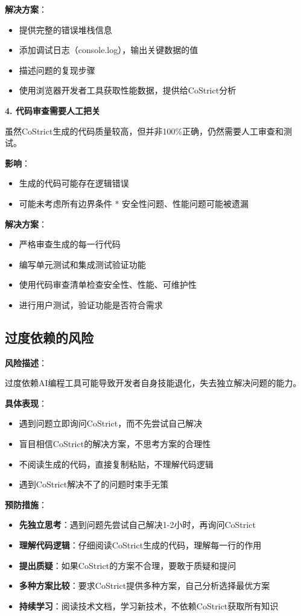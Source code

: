﻿\documentclass[12pt,a4paper]{article}
\begin{document}
\textbf{解决方案}：
\begin{itemize}
    \item 提供完整的错误堆栈信息
    \item 添加调试日志（console.log），输出关键数据的值
    \item 描述问题的复现步骤
    \item 使用浏览器开发者工具获取性能数据，提供给CoStrict分析
\end{itemize}

\textbf{4. 代码审查需要人工把关}

虽然CoStrict生成的代码质量较高，但并非100\%正确，仍然需要人工审查和测试。

\textbf{影响}：
\begin{itemize}
    \item 生成的代码可能存在逻辑错误
    \item 可能未考虑所有边界条件
    * 安全性问题、性能问题可能被遗漏
\end{itemize}

\textbf{解决方案}：
\begin{itemize}
    \item 严格审查生成的每一行代码
    \item 编写单元测试和集成测试验证功能
    \item 使用代码审查清单检查安全性、性能、可维护性
    \item 进行用户测试，验证功能是否符合需求
\end{itemize}

\subsection{过度依赖的风险}

\textbf{风险描述}：

过度依赖AI编程工具可能导致开发者自身技能退化，失去独立解决问题的能力。

\textbf{具体表现}：
\begin{itemize}
    \item 遇到问题立即询问CoStrict，而不先尝试自己解决
    \item 盲目相信CoStrict的解决方案，不思考方案的合理性
    \item 不阅读生成的代码，直接复制粘贴，不理解代码逻辑
    \item 遇到CoStrict解决不了的问题时束手无策
\end{itemize}

\textbf{预防措施}：

\begin{itemize}
    \item \textbf{先独立思考}：遇到问题先尝试自己解决1-2小时，再询问CoStrict
    \item \textbf{理解代码逻辑}：仔细阅读CoStrict生成的代码，理解每一行的作用
    \item \textbf{提出质疑}：如果CoStrict的方案不合理，要敢于质疑和提问
    \item \textbf{多种方案比较}：要求CoStrict提供多种方案，自己分析选择最优方案
    \item \textbf{持续学习}：阅读技术文档，学习新技术，不依赖CoStrict获取所有知识
\end{itemize}
\end{document}
